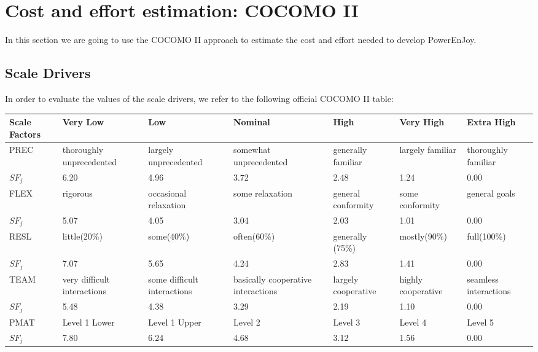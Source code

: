 \section{Cost and effort estimation: COCOMO II}
In this section we are going to use the COCOMO II approach to estimate the
cost and effort needed to develop PowerEnJoy.
\subsection{Scale Drivers}
In order to evaluate the values of the scale drivers, we refer to the following
official COCOMO II table:

\begin{longtable}{| m{}| m{} | m{} | m{} | m{} | m{} | m{}| }
\hline
\textbf{Scale Factors} & \textbf{Very Low} & \textbf{Low} & \textbf{Nominal} & \textbf{High} & \textbf{Very High} & \textbf{Extra High}\\
\hline
PREC & thoroughly unprecedented & largely unprecedented & somewhat unprecedented & generally familiar & largely familiar & thoroughly familiar \\
\newline $SF_j$ & 6.20 & 4.96 & 3.72 & 2.48 & 1.24 & 0.00 \\
\hline
FLEX & rigorous & occasional relaxation & some relaxation & general conformity & some conformity & general goals \\
\newline $SF_j$ & 5.07 & 4.05 & 3.04 & 2.03 & 1.01 & 0.00 \\
\hline
RESL & little(20\%) & some(40\%) & often(60\%) & generally (75\%) & mostly(90\%) & full(100\%) \\
\newline $SF_j$ & 7.07 & 5.65 & 4.24 & 2.83 & 1.41 & 0.00 \\
\hline
TEAM & very difficult interactions & some difficult interactions & basically cooperative interactions & largely cooperative & highly cooperative & seamless interactions \\
\newline $SF_j$ & 5.48 & 4.38 & 3.29 & 2.19 & 1.10 & 0.00\\
\hline
PMAT & Level 1 Lower & Level 1 Upper & Level 2 & Level 3 & Level 4 & Level 5 \\
\newline $SF_j$ & 7.80 & 6.24 & 4.68 & 3.12 & 1.56 & 0.00\\
\hline
\end{longtable}

